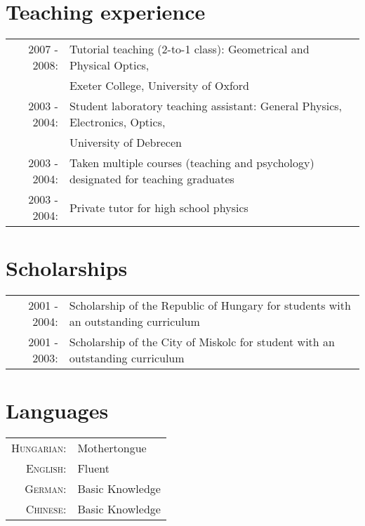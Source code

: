 \documentclass[10pt]{article}
\begin{document}
\section{Teaching experience}
\begin{tabular}{rl}
\textsc{2007 - 2008:} & Tutorial teaching (2-to-1 class): Geometrical and Physical Optics,\\& Exeter College, University of Oxford \\
\textsc{2003 - 2004:} & Student laboratory teaching assistant: General Physics, Electronics, Optics,\\& University of Debrecen \\
\textsc{2003 - 2004:} & Taken multiple courses (teaching and psychology) designated for teaching graduates \\
\textsc{2003 - 2004:} & Private tutor for high school physics
\end{tabular}

\section{Scholarships}
\begin{tabular}{rl}
\textsc{2001 - 2004:} & Scholarship of the Republic of Hungary for students with an outstanding curriculum\\
\textsc{2001 - 2003:} & Scholarship of the City of Miskolc for student with an outstanding curriculum
\end{tabular}

\section{Languages}
\begin{tabular}{rl}
\textsc{Hungarian:}&Mothertongue\\
\textsc{English:}&Fluent\\
\textsc{German:}&Basic Knowledge\\
\textsc{Chinese:}&Basic Knowledge\\
\end{tabular}

\newpage




\end{document}
